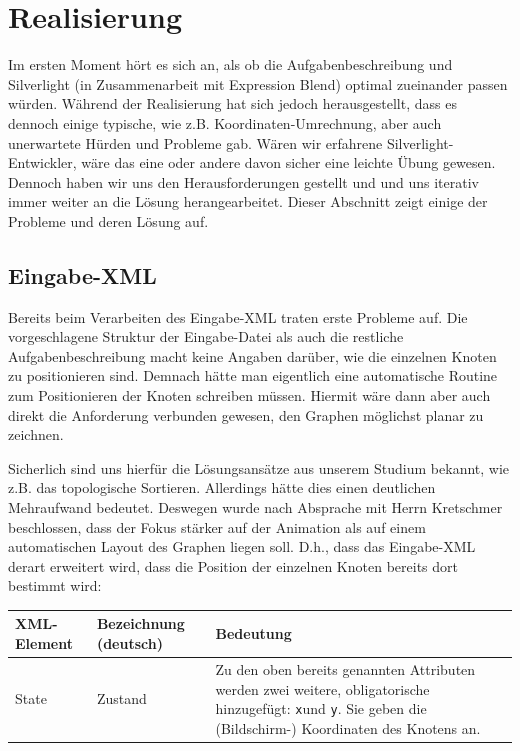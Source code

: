 \section{Realisierung}
Im ersten Moment hört es sich an, als ob die Aufgabenbeschreibung und
Silverlight (in Zusammenarbeit mit Expression Blend) optimal zueinander passen
würden. Während der Realisierung hat sich jedoch herausgestellt, dass es
dennoch einige typische, wie z.B. Koordinaten-Umrechnung, aber auch unerwartete
Hürden und Probleme gab. Wären wir erfahrene Silverlight-Entwickler, wäre das
eine oder andere davon sicher eine leichte Übung gewesen. Dennoch haben wir uns
den Herausforderungen gestellt und und uns iterativ immer weiter an die Lösung
herangearbeitet. Dieser Abschnitt zeigt einige der Probleme und deren Lösung
auf.

\subsection{Eingabe-XML}
Bereits beim Verarbeiten des Eingabe-XML traten erste Probleme auf. Die
vorgeschlagene Struktur der Eingabe-Datei als auch die restliche
Aufgabenbeschreibung macht keine Angaben darüber, wie die einzelnen Knoten zu
positionieren sind. Demnach hätte man eigentlich eine automatische Routine zum
Positionieren der Knoten schreiben müssen. Hiermit wäre dann aber auch direkt
die Anforderung verbunden gewesen, den Graphen möglichst planar zu zeichnen.

Sicherlich sind uns hierfür die Lösungsansätze aus unserem Studium bekannt, wie
z.B. das topologische Sortieren. Allerdings hätte dies einen deutlichen
Mehraufwand bedeutet. Deswegen wurde nach Absprache mit Herrn Kretschmer
beschlossen, dass der Fokus stärker auf der Animation als auf einem
automatischen Layout des Graphen liegen soll. D.h., dass das Eingabe-XML derart
erweitert wird, dass die Position der einzelnen Knoten bereits dort bestimmt
wird:

\begin{table}[H]
	\centering
	\begin{tabular}{|l|l|l|}\hline
XML-Element & Bezeichnung (deutsch) & Bedeutung \\ \hline
State       & Zustand               & 
\begin{minipage}{0.5\textwidth}
		Zu den oben bereits genannten Attributen werden zwei weitere, obligatorische
		hinzugefügt: \texttt{x}und \texttt{y}. Sie geben die (Bildschirm-) Koordinaten des Knotens
		an.\vspace{1ex}
	\end{minipage}\\ \hline
\end{tabular}
\end{table}

